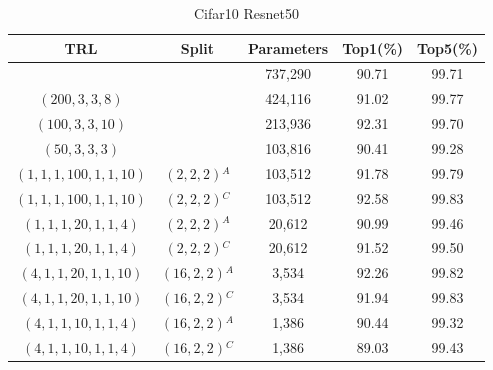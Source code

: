 \documentclass{article}
\begin{document}
	\begin{table}
		\centering
		\begin{tabular}{c c c c c}
			\hline
			\textbf{TRL} & \textbf{Split} & \textbf{Parameters} & \textbf{Top1(\%)} & \textbf{Top5(\%)} \\
			\hline
			& & 737,290 & 90.71 & 99.71 \\
			$(200,3,3,8)$ & & 424,116 & 91.02 & 99.77 \\
			$(100,3,3,10)$ & & 213,936 & 92.31 & 99.70 \\
			$(50,3,3,3)$ & & 103,816 & 90.41 & 99.28 \\
			$(1,1,1,100,1,1,10)$ & $(2,2,2)$$^A$ & 103,512 & 91.78 & 99.79 \\
			$(1,1,1,100,1,1,10)$ & $(2,2,2)$$^C$ & 103,512 & 92.58 & 99.83 \\
			$(1,1,1,20,1,1,4)$ & $(2,2,2)$$^A$ & 20,612 & 90.99 & 99.46 \\
			$(1,1,1,20,1,1,4)$ & $(2,2,2)$$^C$ & 20,612 & 91.52 & 99.50 \\
			$(4,1,1,20,1,1,10)$ & $(16,2,2)$$^A$ & 3,534 & 92.26 & 99.82 \\
			$(4,1,1,20,1,1,10)$ & $(16,2,2)$$^C$ & 3,534 & 91.94 & 99.83 \\
			$(4,1,1,10,1,1,4)$ & $(16,2,2)$$^A$ & 1,386 & 90.44 & 99.32 \\
			$(4,1,1,10,1,1,4)$ & $(16,2,2)$$^C$ & 1,386 & 89.03 & 99.43 \\
			\hline
		\end{tabular}
		\caption{Cifar10 Resnet50}
		\label{Cifar10 Resnet50}
	\end{table}
	
	
	
\end{document}
